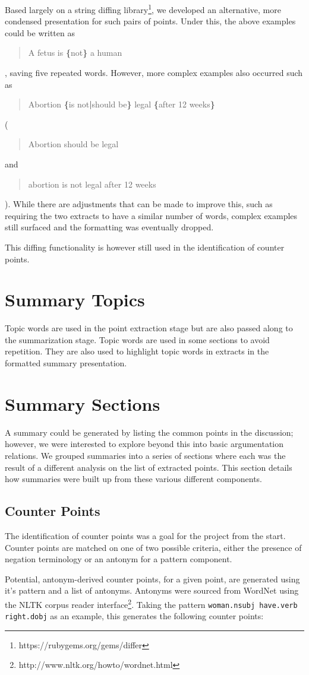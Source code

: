       Based largely on a string diffing library\footnote{https://rubygems.org/gems/differ}, we developed an alternative, more condensed presentation for such pairs of points. Under this, the above examples could be written as \blockquote{A fetus is \textbf{\{}not\textbf{\}} a human}, saving five repeated words. However, more complex examples also occurred such as \blockquote{Abortion \textbf{\{}is not\textbf{|}should be\textbf{\}} legal \textbf{\{}after 12 weeks\textbf{\}}} (\blockquote{Abortion should be legal} and \blockquote{abortion is not legal after 12 weeks}). While there are adjustments that can be made to improve this, such as requiring the two extracts to have a similar number of words, complex examples still surfaced and the formatting was eventually dropped.

      This diffing functionality is however still used in the identification of counter points.

  \section{Summary Topics}
    Topic words are used in the point extraction stage but are also passed along to the summarization stage. Topic words are used in some sections to avoid repetition. They are also used to highlight topic words in extracts in the formatted summary presentation.

  \section{Summary Sections}
    A summary could be generated by listing the common points in the discussion; however, we were interested to explore beyond this into basic argumentation relations. We grouped summaries into a series of sections where each was the result of a different analysis on the list of extracted points. This section details how summaries were built up from these various different components.

    \subsection{Counter Points}

      The identification of counter points was a goal for the project from the start. Counter points are matched on one of two possible criteria, either the presence of negation terminology or an antonym for a pattern component.

      Potential, antonym-derived counter points, for a given point, are generated using it's pattern and a list of antonyms. Antonyms were sourced from WordNet \cite{miller1995wordnet} using the NLTK corpus reader interface\footnote{http://www.nltk.org/howto/wordnet.html}. Taking the pattern \texttt{woman.nsubj have.verb right.dobj} as an example, this generates the following counter points:


